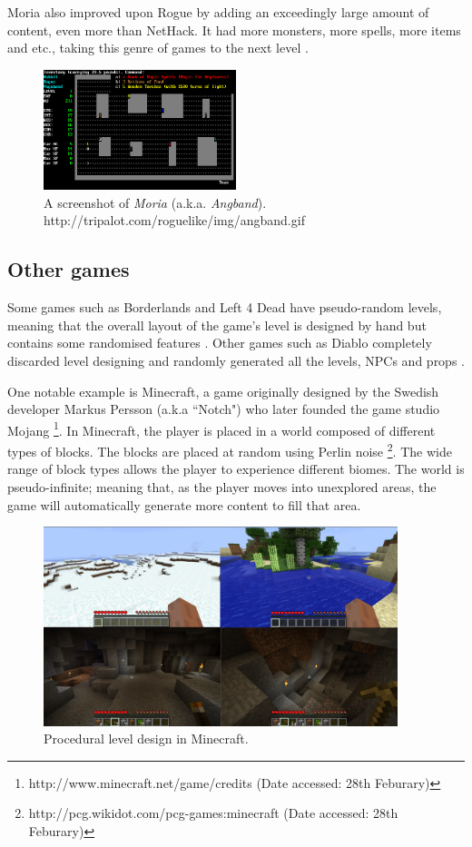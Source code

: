 Moria also improved upon Rogue by adding an exceedingly large amount of content, even more than NetHack. It had more monsters, more spells, more items and etc., taking this genre of games to the next level \citep{Roguelike}.
\begin{figure}[h!]
\centering
\includegraphics[width=0.50\textwidth]{images/moria.png}
\caption{A screenshot of {\em Moria} (a.k.a. {\em Angband}).
\\{\footnotesize http://tripalot.com/roguelike/img/angband.gif} }
\end{figure}

	\subsection{Other games}
Some games such as Borderlands and Left 4 Dead have pseudo-random levels, meaning that the overall layout of the game's level is designed by hand but contains some randomised features \citep{DBLP:journals/tciaig/TogeliusYSB11}. Other games such as Diablo completely discarded level designing and randomly generated all the levels, NPCs and props \citep{Nitsche-CaseStudy}.

One notable example is Minecraft, a game originally designed by the Swedish developer Markus Persson (a.k.a ``Notch") who later founded the game studio Mojang \footnote{http://www.minecraft.net/game/credits (Date accessed: 28th Feburary)}. In Minecraft, the player is placed in a world composed of different types of blocks. The blocks are placed at random using Perlin noise \footnote{http://pcg.wikidot.com/pcg-games:minecraft (Date accessed: 28th Feburary)}. The wide range of block types allows the player to experience different biomes.  The world is pseudo-infinite; meaning that, as the player moves into unexplored areas, the game will automatically generate more content to fill that area.
\begin{figure}[h!]
\centering
\includegraphics[width=0.92\textwidth]{images/minecraft.png}
\caption{Procedural level design in Minecraft.}
\end{figure}

